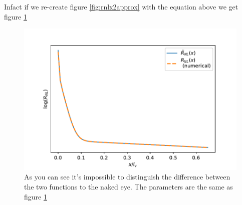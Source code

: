 Infact if we re-create figure \ref{fig:rnlx2approx} with the equation above we get figure \ref{fig:rnlxapprox}
\begin{figure}[h!]
    \centering
    \includegraphics[width=\linewidth]{Immagini/rnl/xapprox.pdf}
    \caption{As you can see it's impossible to distinguish the difference between the two functions to the naked eye. The parameters are the same as figure \ref{fig:rnlxapprox}}
    \label{fig:rnlxapprox}
\end{figure}